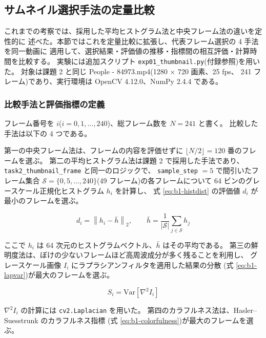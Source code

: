 \subsection{サムネイル選択手法の定量比較}

これまでの考察では、採用した平均ヒストグラム法と中央フレーム法の違いを定性的に
述べた。本節ではこれを定量比較に拡張し、代表フレーム選択の 4 手法を同一動画に
適用して、選択結果・評価値の推移・指標間の相互評価・計算時間を比較する。
実験には追加スクリプト {\tt exp01\_thumbnail.py}(付録参照)を用いた。
対象は課題 2 と同じ People - 84973.mp4(1280 $\times$ 720 画素、25 fps、
241 フレーム)であり、実行環境は OpenCV 4.12.0、NumPy 2.4.4 である。

\subsubsection{比較手法と評価指標の定義}

フレーム番号を $i$($i = 0, 1, \dots, 240$)、総フレーム数を $N = 241$ と書く。
比較した手法は以下の 4 つである。

第一の中央フレーム法は、フレームの内容を評価せずに
$\lfloor N/2 \rfloor = 120$ 番のフレームを選ぶ。
第二の平均ヒストグラム法は課題 2 で採用した手法であり、
{\tt task2\_thumbnail\_frame} と同一のロジックで、
{\tt sample\_step} $= 5$ で間引いたフレーム集合
$\mathcal{S} = \{0, 5, \dots, 240\}$(49 フレーム)の各フレームについて
64 ビンのグレースケール正規化ヒストグラム $h_i$ を計算し、
式 \ref{eq:b1-histdist} の評価値 $d_i$ が最小のフレームを選ぶ。

\begin{equation}\label{eq:b1-histdist}
d_i = \left\| h_i - \bar{h} \right\|_2 , \qquad
\bar{h} = \frac{1}{|\mathcal{S}|} \sum_{j \in \mathcal{S}} h_j
\end{equation}

ここで $h_i$ は 64 次元のヒストグラムベクトル、$\bar{h}$ はその平均である。
第三の鮮明度法は、ぼけの少ないフレームほど高周波成分が多く残ることを利用し、
グレースケール画像 $I_i$ にラプラシアンフィルタを適用した結果の分散
(式 \ref{eq:b1-lapvar})が最大のフレームを選ぶ。

\begin{equation}\label{eq:b1-lapvar}
S_i = \mathrm{Var}\left[ \nabla^2 I_i \right]
\end{equation}

$\nabla^2 I_i$ の計算には {\tt cv2.Laplacian} を用いた。
第四のカラフルネス法は、Hasler--Suesstrunk のカラフルネス指標
(式 \ref{eq:b1-colorfulness})が最大のフレームを選ぶ。

